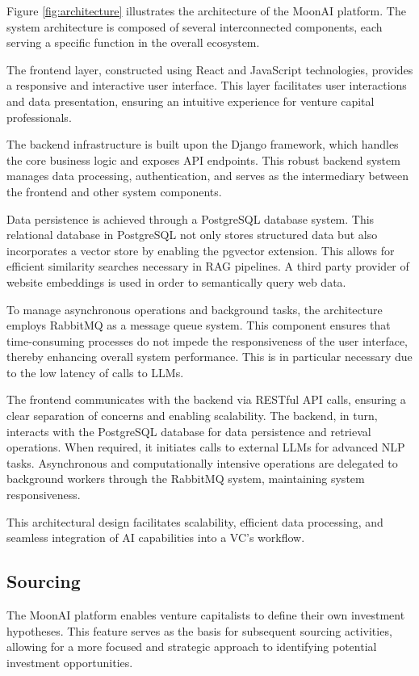\documentclass[a4paper, oneside]{discothesis}
\begin{document}
\noindent Figure \ref{fig:architecture} illustrates the architecture of the MoonAI platform. The system architecture is composed of several interconnected components, each serving a specific function in the overall ecosystem.

The frontend layer, constructed using React and JavaScript technologies, provides a responsive and interactive user interface. This layer facilitates user interactions and data presentation, ensuring an intuitive experience for venture capital professionals.

The backend infrastructure is built upon the Django framework, which handles the core business logic and exposes API endpoints. This robust backend system manages data processing, authentication, and serves as the intermediary between the frontend and other system components.

Data persistence is achieved through a PostgreSQL database system. This relational database in PostgreSQL not only stores structured data but also incorporates a vector store by enabling the pgvector extension. This allows for efficient similarity searches necessary in RAG pipelines. A third party provider of website embeddings is used in order to semantically query web data.

To manage asynchronous operations and background tasks, the architecture employs RabbitMQ as a message queue system. This component ensures that time-consuming processes do not impede the responsiveness of the user interface, thereby enhancing overall system performance. This is in particular necessary due to the low latency of calls to LLMs.

The frontend communicates with the backend via RESTful API calls, ensuring a clear separation of concerns and enabling scalability. The backend, in turn, interacts with the PostgreSQL database for data persistence and retrieval operations. When required, it initiates calls to external LLMs for advanced NLP tasks. Asynchronous and computationally intensive operations are delegated to background workers through the RabbitMQ system, maintaining system responsiveness.

This architectural design facilitates scalability, efficient data processing, and seamless integration of AI capabilities into a VC's workflow.

\subsection{Sourcing}
The MoonAI platform enables venture capitalists to define their own investment hypotheses. 
This feature serves as the basis for subsequent sourcing activities, allowing for a more focused and strategic approach to identifying potential investment opportunities.
\end{document}
